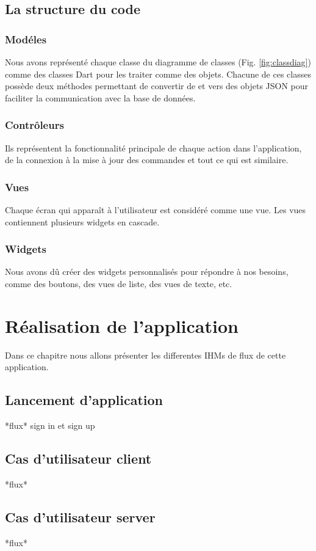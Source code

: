 \documentclass[french, a4paper, 12pt]{report}
\begin{document}
	
	\newpage		
	\section{La structure du code}
		\subsection{Modéles} Nous avons représenté chaque classe du diagramme de classes (Fig. \ref{fig:classdiag}) comme des classes Dart pour les traiter comme des objets. Chacune de ces classes possède deux méthodes permettant de convertir de et vers des objets JSON  pour faciliter la communication avec la base de données.
		\subsection{Contrôleurs} Ils représentent la fonctionnalité principale de chaque action dans l'application, de la connexion à la mise à jour des commandes et tout ce qui est similaire.
		\subsection{Vues} Chaque écran qui apparaît à l'utilisateur est considéré comme une vue. Les vues contiennent plusieurs widgets en cascade.
		\subsection{Widgets} Nous avons dû créer des widgets personnalisés pour répondre à nos besoins, comme des boutons, des vues de liste, des vues de texte, etc.
		
\newpage
\chapter{Réalisation de l'application} Dans ce chapitre nous allons présenter les differentes IHMs de flux de cette application.
	\section{Lancement d'application} *flux* sign in et sign up
	\section{Cas d'utilisateur client} *flux*
	\section{Cas d'utilisateur server} *flux*
\end{document}

